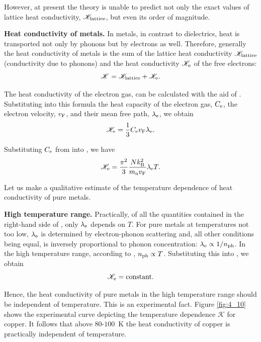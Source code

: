 However, at present the theory is unable to predict not only the exact values of lattice heat conductivity, $\mathscr{K}_{\text{lattice}}$, but even its order of magnitude.

\textbf{Heat conductivity of metals.} In metals, in contrast to dielectrics, heat is transported not only by phonons but by electrons as well. Therefore, generally the heat conductivity of metals is the sum of the lattice heat conductivity $\mathscr{K}_{\text{lattice}}$ (conductivity due to phonons) and the heat conductivity $\mathscr{K}_{\text{e}}$ of the free electrons:
\begin{equation*}
    \mathscr{K} = \mathscr{K}_{\text{lattice}} + \mathscr{K}_{\text{e}}.
\end{equation*}

The heat conductivity of the electron gas, can be calculated with the aid of . Substituting into this formula the heat capacity of the electron gas, $C_{\text{e}}$, the electron velocity, $v_{\text{F}}$, and their mean free path, $\lambda_{\text{e}}$, we obtain
\begin{equation}\label{eq:4_57}
    \mathscr{K}_{\text{e}} = \frac{1}{3} C_{\text{e}} v_{\text{F}} \lambda_{\text{e}}.
\end{equation}

\noindent
Substituting $C_{\text{e}}$ from  into , we have
\begin{equation}\label{eq:4_58}
    \mathscr{K}_{\text{e}} = \frac{\pi^2}{3} \frac{N k_{\text{B}}^2}{m_{\text{n}} v_{\text{F}}} \lambda_{\text{e}} T.
\end{equation}

Let us make a qualitative estimate of the temperature dependence of heat conductivity of pure metals.

\textbf{High temperature range.} Practically, of all the quantities contained in the right-hand side of , only $\lambda_{\text{e}}$ depends on $T$. For pure metals at temperatures not too low, $\lambda_{\text{e}}$ is determined by electron-phonon scattering and, all other conditions being equal, is inversely proportional to phonon concentration: $\lambda_{\text{e}}\propto 1/n_{\text{ph}}$. In the high temperature range, according to , $n_{\text{ph}}\propto T$. Substituting this into , we obtain
\begin{equation}\label{eq:4_59}
    \mathscr{K}_{\text{e}} = \text{constant}.
\end{equation}

\noindent
Hence, the heat conductivity of pure metals in the high temperature range should be independent of temperature. This is an experimental fact. Figure \ref{fig:4_10} shows the experimental curve depicting the temperature dependence $\mathscr{K}$ for copper. It follows that above $80$-$100$~K the heat conductivity of copper is practically independent of temperature.

